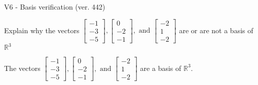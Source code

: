 \begin{exercise}
  \begin{exerciseTitle}V6 - Basis verification (ver. 442)\end{exerciseTitle}
  \begin{exerciseStatement}
    Explain why the vectors \(\left[\begin{array}{r}
-1 \\
-3 \\
-5
\end{array}\right] , \left[\begin{array}{r}
0 \\
-2 \\
-1
\end{array}\right] , \text{ and } \left[\begin{array}{r}
-2 \\
1 \\
-2
\end{array}\right]\) are or are not a basis of \(\mathbb{R}^3\)	


  \end{exerciseStatement}
  \begin{exerciseAnswer}
   The vectors \(\left[\begin{array}{r}
-1 \\
-3 \\
-5
\end{array}\right] , \left[\begin{array}{r}
0 \\
-2 \\
-1
\end{array}\right] , \text{ and } \left[\begin{array}{r}
-2 \\
1 \\
-2
\end{array}\right]\) 
  	 are  a basis of \(\mathbb{R}^3\).
  


  \end{exerciseAnswer}
\end{exercise}